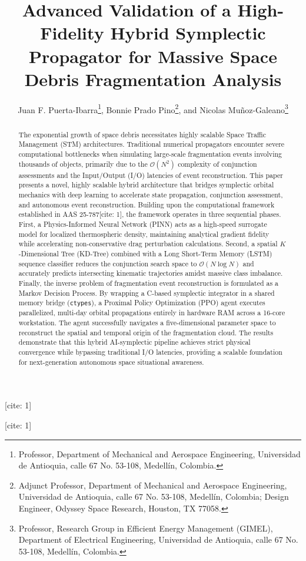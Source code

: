 \documentclass[conf]{AAS} %
\begin{document}
\title{Advanced Validation of a High-Fidelity Hybrid Symplectic Propagator for Massive Space Debris Fragmentation Analysis} [cite: 1]
\author{Juan F. Puerta-Ibarra\footnote{Professor, Department of Mechanical and Aerospace Engineering, Universidad de Antioquia, calle 67 No. 53-108, Medellín, Colombia.}, Bonnie Prado Pino\footnote{Adjunct Professor, Department of Mechanical and Aerospace Engineering, Universidad de Antioquia, calle 67 No. 53-108, Medellín, Colombia; Design Engineer, Odyssey Space Research, Houston, TX 77058.}, and Nicolas Muñoz-Galeano\footnote{Professor, Research Group in Efficient Energy Management (GIMEL), Department of Electrical Engineering, Universidad de Antioquia, calle 67 No. 53-108, Medellín, Colombia.}} [cite: 1]


\maketitle

\begin{abstract}
The exponential growth of space debris necessitates highly scalable Space Traffic Management (STM) architectures. Traditional numerical propagators encounter severe computational bottlenecks when simulating large-scale fragmentation events involving thousands of objects, primarily due to the $\mathcal{O}(N^2)$ complexity of conjunction assessments and the Input/Output (I/O) latencies of event reconstruction. This paper presents a novel, highly scalable hybrid architecture that bridges symplectic orbital mechanics with deep learning to accelerate state propagation, conjunction assessment, and autonomous event reconstruction. Building upon the computational framework established in AAS 25-787[cite: 1], the framework operates in three sequential phases. First, a Physics-Informed Neural Network (PINN) acts as a high-speed surrogate model for localized thermospheric density, maintaining analytical gradient fidelity while accelerating non-conservative drag perturbation calculations. Second, a spatial $K$-Dimensional Tree (KD-Tree) combined with a Long Short-Term Memory (LSTM) sequence classifier reduces the conjunction search space to $\mathcal{O}(N \log N)$ and accurately predicts intersecting kinematic trajectories amidst massive class imbalance. Finally, the inverse problem of fragmentation event reconstruction is formulated as a Markov Decision Process. By wrapping a C-based symplectic integrator in a shared memory bridge (\texttt{ctypes}), a Proximal Policy Optimization (PPO) agent executes parallelized, multi-day orbital propagations entirely in hardware RAM across a 16-core workstation. The agent successfully navigates a five-dimensional parameter space to reconstruct the spatial and temporal origin of the fragmentation cloud. The results demonstrate that this hybrid AI-symplectic pipeline achieves strict physical convergence while bypassing traditional I/O latencies, providing a scalable foundation for next-generation autonomous space situational awareness.
\end{abstract}
\end{document}
